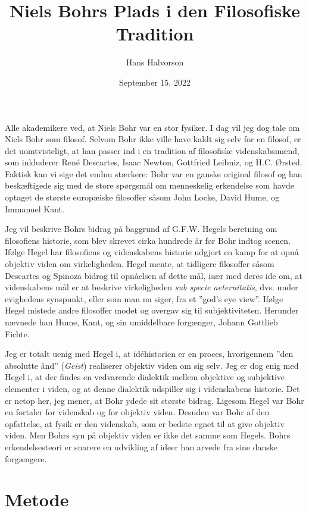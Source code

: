 \documentclass[12pt]{article}
\author{Hans Halvorson}
\title{Niels Bohrs Plads i den Filosofiske Tradition}
\date{September 15, 2022}
\begin{document}
\maketitle

Alle akademikere ved, at Niels Bohr var en stor fysiker. I dag vil jeg
dog tale om Niels Bohr som filosof. Selvom Bohr ikke ville have kaldt
sig selv for en filosof, er det uomtvisteligt, at han passer ind i en
tradition af filosofiske videnskabsmænd, som inkluderer René
Descartes, Isaac Newton, Gottfried Leibniz, og H.C. Ørsted. Faktisk
kan vi sige det endnu stærkere: Bohr var en ganske original filosof og
han beskæftigede sig med de store spørgsmål om menneskelig erkendelse
som havde optaget de største europæiske filosoffer såsom John Locke,
David Hume, og Immanuel Kant.

Jeg vil beskrive Bohrs bidrag på baggrund af G.F.W. Hegels beretning om
filosofiens historie, som blev skrevet cirka hundrede år før Bohr indtog
scenen. Ifølge Hegel har filosofiens og videnskabens historie udgjort en
kamp for at opnå objektiv viden om virkeligheden. Hegel mente, at
tidligere filosoffer såsom Descartes og Spinoza bidrog til opnåelsen af
dette mål, især med deres ide om, at videnskabens mål er at beskrive
virkeligheden \emph{sub specie aeternitatis}, dvs. under evighedens
synspunkt, eller som man nu siger, fra et ''god's eye view''. Ifølge
Hegel mistede andre filosoffer modet og overgav sig til subjektiviteten.
Herunder nævnede han Hume, Kant, og sin umiddelbare forgænger, Johann
Gottlieb Fichte.

Jeg er totalt uenig med Hegel i, at idéhistorien er en proces,
hvorigennem ''den absolutte ånd'' (\emph{Geist}) realiserer objektiv
viden om sig selv. Jeg er dog enig med Hegel i, at der findes en
vedvarende dialektik mellem objektive og subjektive elementer i viden,
og at denne dialektik udspiller sig i videnskabens historie. Det er
netop her, jeg mener, at Bohr ydede sit største bidrag. Ligesom Hegel
var Bohr en fortaler for videnskab og for objektiv viden. Desuden var
Bohr af den opfattelse, at fysik er den videnskab, som er bedste egnet
til at give objektiv viden. Men Bohrs syn på objektiv viden er ikke det
samme som Hegels. Bohrs erkendelsesteori er snarere en udvikling af
ideer han arvede fra sine danske forgængere.

\hypertarget{metode}{%
\section{Metode}\label{metode}}
\end{document}
